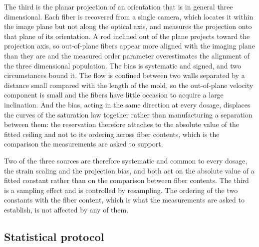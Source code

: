 \documentclass[%
  aip,
  pof,          %
  reprint,      %
  floatfix
]{revtex4-2}
\begin{document}
The third is the planar projection of an orientation that is in general three dimensional. Each fiber is recovered from a single camera, which locates it within the image plane but not along the optical axis, and measures the projection onto that plane of its orientation. A rod inclined out of the plane projects toward the projection axis, so out-of-plane fibers appear more aligned with the imaging plane than they are and the measured order parameter overestimates the alignment of the three dimensional population. The bias is systematic and signed, and two circumstances bound it. The flow is confined between two walls separated by a distance small compared with the length of the mold, so the out-of-plane velocity component is small and the fibers have little occasion to acquire a large inclination. And the bias, acting in the same direction at every dosage, displaces the curves of the saturation law together rather than manufacturing a separation between them: the reservation therefore attaches to the absolute value of the fitted ceiling and not to its ordering across fiber contents, which is the comparison the measurements are asked to support.

Two of the three sources are therefore systematic and common to every dosage, the strain scaling and the projection bias, and both act on the absolute value of a fitted constant rather than on the comparison between fiber contents. The third is a sampling effect and is controlled by resampling. The ordering of the two constants with the fiber content, which is what the measurements are asked to establish, is not affected by any of them.

\subsection{Statistical protocol}
\label{sec:framework_stats}
\end{document}
